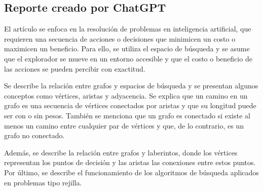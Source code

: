 \newpage
\subsection*{Reporte creado por ChatGPT}
	\noindent El artículo se enfoca en la resolución de problemas en inteligencia artificial, que requieren una secuencia de acciones o decisiones que minimicen un costo o maximicen un beneficio. Para ello, se utiliza el espacio de búsqueda y se asume que el explorador se mueve en un entorno accesible y que el costo o beneficio de las acciones se pueden percibir con exactitud.
	
	Se describe la relación entre grafos y espacios de búsqueda y se presentan algunos conceptos como vértices, aristas y adyacencia. Se explica que un camino en un grafo es una secuencia de vértices conectados por aristas y que su longitud puede ser con o sin pesos. También se menciona que un grafo es conectado si existe al menos un camino entre cualquier par de vértices y que, de lo contrario, es un grafo no conectado.
	
	Además, se describe la relación entre grafos y laberintos, donde los vértices representan los puntos de decisión y las aristas las conexiones entre estos puntos. Por último, se describe el funcionamiento de los algoritmos de búsqueda aplicados en problemas tipo rejilla.